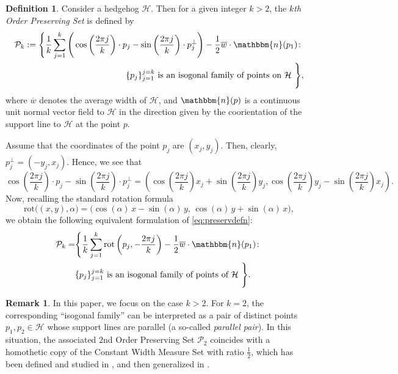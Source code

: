 \documentclass{amsart}
\theoremstyle{definition}
\newtheorem{defn}[thm]{Definition}
\newtheorem{rem}[thm]{Remark}
\numberwithin{equation}{section}
\newcommand{\rot}{\mathrm{rot}}
\begin{document}
\begin{defn}\label{preserving set}
Consider a hedgehog $\mathcal{H}$. Then for a given integer $k>2$, the \textit{$k$th Order Preserving Set} is defined by
\begin{align}
\label{eq:preservdefn}\mathcal{P}_k:=\Bigg\{\frac{1}{k}\sum_{j=1}^{k}\Bigg(\cos\left(\frac{2\pi j}{k}\right)\cdot p_j-\sin\left(\frac{2\pi j}{k}\right)\cdot p_j^{\perp}\Bigg) -\frac{1}{2}\overline{w}\cdot \mathbbm{n}(p_1)\colon\\ 
\nonumber \{p_j\}_{j=1}^{j=k} \text{ is an isogonal family of points on $\mathcal{H}$ }\Bigg\},
\end{align}
where $\overline{w}$ denotes the average width of $\mathcal{H}$, and $\mathbbm{n}(p)$ is 
a continuous unit normal vector field to $\mathcal{H}$ in the direction given by the coorientation of the support line to $\mathcal{H}$ at the point $p$.
\end{defn}

Assume that the coordinates of the point $p_j$ are $(x_j,y_j)$. Then, clearly, 
$p_j^\perp = (-y_j,x_j)$. Hence, we see that
{\footnotesize$$\cos\left(\frac{2\pi j}{k}\right)\cdot p_j-\sin\left(\frac{2\pi j}{k}\right)\cdot p_j^{\perp} = \left(\cos\left(\frac{2\pi j}{k}\right)x_j + \sin\left(\frac{2\pi j}{k}\right)y_j,\cos\left(\frac{2\pi j}{k}\right)y_j - \sin\left(\frac{2\pi j}{k}\right)x_j\right).$$}
Now, recalling the standard rotation formula
\[
\rot\big((x,y),\alpha\big) = \big(\cos(\alpha)\, x - \sin(\alpha)\, y,\,
\cos(\alpha)\, y + \sin(\alpha)\, x\big),
\]
we obtain the following equivalent formulation of \eqref{eq:preservdefn}:
\begin{align*} \mathcal{P}_k=&\Bigg\{\frac{1}{k}\sum_{j=1}^{k}\rot\left(p_j,-\frac{2\pi j}{k}\right)-\frac{1}{2}\overline{w}\cdot \mathbbm{n}(p_1)\colon\\ &\{p_j\}_{j=1}^{j=k} \text{ is an isogonal family of points of $\mathcal{H}$ }\Bigg\}. \end{align*}



\begin{rem}\label{remCWMS}
In this paper, we focus on the case $k>2$. For $k=2$, the corresponding “isogonal family” 
can be interpreted as a pair of distinct points $p_1,p_2\in\mathcal{H}$ whose support 
lines are parallel (a so-called \textit{parallel pair}). In this situation, the associated $2$nd 
Order Preserving Set $\mathcal{P}_2$ coincides with a homothetic copy of the Constant 
Width Measure Set with ratio $\frac{1}{2}$, which has been defined and studied in \cite{ZCWMS}, and then generalized in \cite{SC1, Z3}.
\end{rem}
\end{document}
